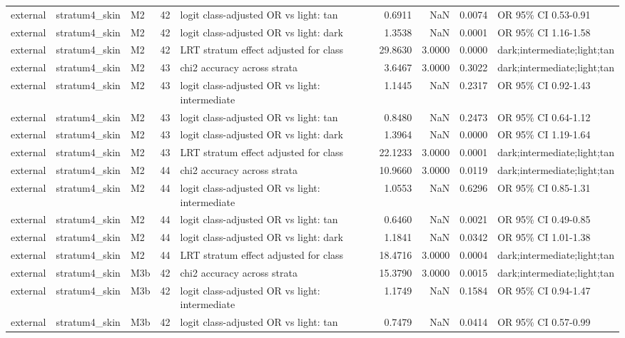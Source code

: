 \begin{tabular}{lllrlrrrl}
external & stratum4\_skin & M2 & 42 & logit class-adjusted OR vs light: tan & 0.6911 & NaN & 0.0074 & OR 95\% CI 0.53-0.91 \\
external & stratum4\_skin & M2 & 42 & logit class-adjusted OR vs light: dark & 1.3538 & NaN & 0.0001 & OR 95\% CI 1.16-1.58 \\
external & stratum4\_skin & M2 & 42 & LRT stratum effect adjusted for class & 29.8630 & 3.0000 & 0.0000 & dark;intermediate;light;tan \\
external & stratum4\_skin & M2 & 43 & chi2 accuracy across strata & 3.6467 & 3.0000 & 0.3022 & dark;intermediate;light;tan \\
external & stratum4\_skin & M2 & 43 & logit class-adjusted OR vs light: intermediate & 1.1445 & NaN & 0.2317 & OR 95\% CI 0.92-1.43 \\
external & stratum4\_skin & M2 & 43 & logit class-adjusted OR vs light: tan & 0.8480 & NaN & 0.2473 & OR 95\% CI 0.64-1.12 \\
external & stratum4\_skin & M2 & 43 & logit class-adjusted OR vs light: dark & 1.3964 & NaN & 0.0000 & OR 95\% CI 1.19-1.64 \\
external & stratum4\_skin & M2 & 43 & LRT stratum effect adjusted for class & 22.1233 & 3.0000 & 0.0001 & dark;intermediate;light;tan \\
external & stratum4\_skin & M2 & 44 & chi2 accuracy across strata & 10.9660 & 3.0000 & 0.0119 & dark;intermediate;light;tan \\
external & stratum4\_skin & M2 & 44 & logit class-adjusted OR vs light: intermediate & 1.0553 & NaN & 0.6296 & OR 95\% CI 0.85-1.31 \\
external & stratum4\_skin & M2 & 44 & logit class-adjusted OR vs light: tan & 0.6460 & NaN & 0.0021 & OR 95\% CI 0.49-0.85 \\
external & stratum4\_skin & M2 & 44 & logit class-adjusted OR vs light: dark & 1.1841 & NaN & 0.0342 & OR 95\% CI 1.01-1.38 \\
external & stratum4\_skin & M2 & 44 & LRT stratum effect adjusted for class & 18.4716 & 3.0000 & 0.0004 & dark;intermediate;light;tan \\
external & stratum4\_skin & M3b & 42 & chi2 accuracy across strata & 15.3790 & 3.0000 & 0.0015 & dark;intermediate;light;tan \\
external & stratum4\_skin & M3b & 42 & logit class-adjusted OR vs light: intermediate & 1.1749 & NaN & 0.1584 & OR 95\% CI 0.94-1.47 \\
external & stratum4\_skin & M3b & 42 & logit class-adjusted OR vs light: tan & 0.7479 & NaN & 0.0414 & OR 95\% CI 0.57-0.99 \\

\end{tabular}
